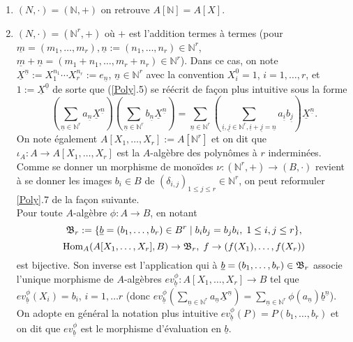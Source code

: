 \documentclass[a4paper, oneside, 12pt]{book}
\theoremstyle{definition} %
\newcommand{\N}{\mathbb{N}}
\begin{document}
  \begin{enumerate}[leftmargin=* ,parsep=0cm,itemsep=0cm,topsep=0cm]
 \item  $(N,\cdot)=(\N,+)$ on retrouve $A[\N]=A[X]$.\\
 \item $(N,\cdot)=(\N^r,+)$ où $+$ est l'addition termes à termes (pour $\underline{m}=(m_1,\dots,m_r), \underline{n}:=(n_1,\dots, n_r)\in \N^r$,   $\underline{m}+\underline{n}=(m_1+n_1,\dots,m_r+n_r)\in \N^r$). Dans ce cas, on note $\underline{X}^{\underline{n}}:=X_1^{n_1}\cdots X_r^{n_r}:=e_{\underline{n}}$, $\underline{n}\in \N^r$ avec la convention $X_i^0=1$, $i=1,\dots, r$,  et $1:=\underline{X}^{\underline{0}}$ de sorte que (\ref{Poly}.5) se réécrit de fa\c{c}on plus intuitive sous la forme
 $$ (\sum_{\underline{n}\in\N^r}a_{\underline{n}}\underline{X}^{\underline{n}}) (\sum_{\underline{n}\in \N^r}b_{\underline{n}}\underline{X}^{\underline{n}})=\sum_{\underline{n}\in \N^r}(\sum_{\underline{i},\underline{j}\in \N^r, \underline{i}+\underline{j}=\underline{n}}a_{\underline{i}}b_{\underline{j}})\underline{X}^{\underline{n}}.$$
On note également $A[X_1,\dots, X_r]:=A[\N^r]$ et on dit que $\iota_A:A\rightarrow A[X_1,\dots, X_r]$ est la $A$-algèbre des polynômes à $r$ inderminées. Comme se donner un morphisme de monoïdes $\nu:(\N^r,+)\rightarrow (B ,\cdot)$ revient à se donner les images $b_i\in B $ de $(\delta_{i,j})_{1\leq j\leq r}\in \N^r$, on peut reformuler \ref{Poly}.7 de la fa\c{c}on suivante.\\

   Pour toute $A$-algèbre $\phi:A\rightarrow B$, en notant  
 $$\frak{B}_r:= \lbrace \underline{b}=(b_1,\dots, b_r)\in B^r\;|\; b_ib_j=b_jb_i,\; 1\leq i,j\leq r\rbrace,$$
$$\hbox{\rm Hom}_A(A[X_1,\dots,X_r],B)\rightarrow \frak{B}_r,\; f\rightarrow (f(X_1),\dots, f(X_r))$$
 est bijective. Son inverse est l'application qui à $\underline{b}=(b_1,\dots, b_r)\in \frak{B}_r$ associe l'unique morphisme de $A$-algèbres $ev_{\underline{b}}^\phi:A[X_1,\dots, X_r]\rightarrow B$ tel que $ev_{\underline{b}}^\phi(X_i)=b_i$, $i=1,\dots r$ (donc $ev_{\underline{b}}^\phi(\sum_{\underline{n}\in \N^r}a_{\underline{n}}\underline{X}^{\underline{n}})=\sum_{\underline{n}\in \N^r}\phi(a_{\underline{n}})\underline{b}^{\underline{n}}$). On adopte  en général la notation plus intuitive $ev_{\underline{b}}^\phi(P)=P(b_1,\dots, b_r)$ et on dit que $ev_{\underline{b}}^\phi$ est le morphisme d'évaluation en $\underline{b}$.\\
 

\end{enumerate}
\end{document}
